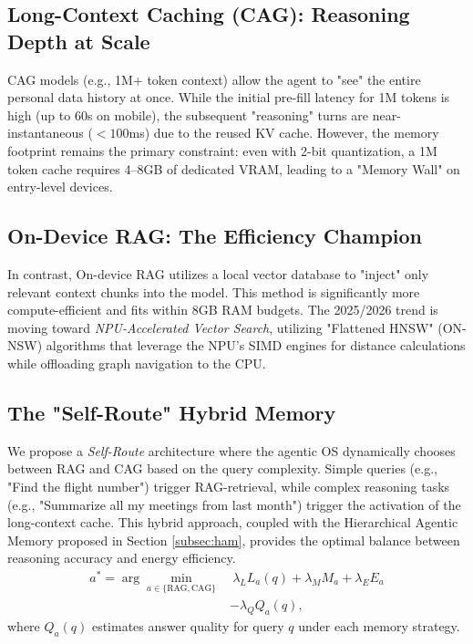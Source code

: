 \documentclass[twocolumn,10pt]{article}
\begin{document}
\subsection{Long-Context Caching (CAG): Reasoning Depth at Scale}
CAG models (e.g., 1M+ token context) allow the agent to "see" the entire personal data history at once. While the initial pre-fill latency for 1M tokens is high (up to 60s on mobile), the subsequent "reasoning" turns are near-instantaneous ($<100$ms) due to the reused KV cache. However, the memory footprint remains the primary constraint: even with 2-bit quantization, a 1M token cache requires 4--8GB of dedicated VRAM, leading to a "Memory Wall" on entry-level devices.

\subsection{On-Device RAG: The Efficiency Champion}
In contrast, On-device RAG utilizes a local vector database to "inject" only relevant context chunks into the model. This method is significantly more compute-efficient and fits within 8GB RAM budgets. The 2025/2026 trend is moving toward \textit{NPU-Accelerated Vector Search}, utilizing "Flattened HNSW" (ON-NSW) algorithms that leverage the NPU's SIMD engines for distance calculations while offloading graph navigation to the CPU.

\subsection{The "Self-Route" Hybrid Memory}
We propose a \textit{Self-Route} architecture where the agentic OS dynamically chooses between RAG and CAG based on the query complexity. Simple queries (e.g., "Find the flight number") trigger RAG-retrieval, while complex reasoning tasks (e.g., "Summarize all my meetings from last month") trigger the activation of the long-context cache. This hybrid approach, coupled with the Hierarchical Agentic Memory proposed in Section \ref{subsec:ham}, provides the optimal balance between reasoning accuracy and energy efficiency.
\begin{equation}
\begin{aligned}
a^*=\arg\min_{a\in\{\mathrm{RAG},\mathrm{CAG}\}}
&\ \lambda_L L_a(q)+\lambda_M M_a+\lambda_E E_a\\
&-\lambda_Q Q_a(q),
\end{aligned}
\label{eq:self_route}
\end{equation}
where $Q_a(q)$ estimates answer quality for query $q$ under each memory strategy.
\end{document}
